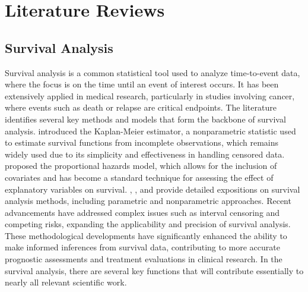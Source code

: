\chapter{Literature Reviews}
\section{Survival Analysis}
Survival analysis is a common statistical tool used to analyze time-to-event data, where the focus is on the time until an event of interest occurs.
It has been extensively applied in medical research, particularly in studies involving cancer, where events such as death or relapse are critical endpoints.
The literature identifies several key methods and models that form the backbone of survival analysis. \citet{kaplan1958nonparametric} introduced the Kaplan-Meier estimator, a nonparametric statistic used to estimate survival functions from incomplete observations, which remains widely used due to its simplicity and effectiveness in handling censored data.
\citet{cox1972regression} proposed the proportional hazards model, which allows for the inclusion of covariates and has become a standard technique for assessing the effect of explanatory variables on survival.
\citet{collett2023modelling}, \citet{machin2006survival}, and \citet{kleinbaum1996survival} provide detailed expositions on survival analysis methods, including parametric and nonparametric approaches.
Recent advancements have addressed complex issues such as interval censoring and competing risks, expanding the applicability and precision of survival analysis.
These methodological developments have significantly enhanced the ability to make informed inferences from survival data, contributing to more accurate prognostic assessments and treatment evaluations in clinical research.
In the survival analysis, there are several key functions that will contribute essentially to nearly all relevant scientific work. 

